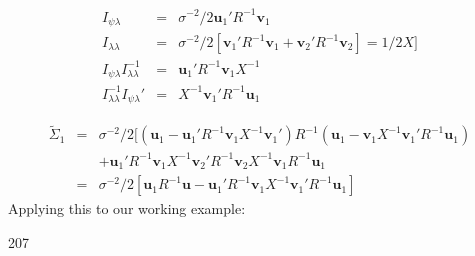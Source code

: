 \documentclass[12pt]{article}
\newcommand{\x}{\mathbf{x}}
\newcommand{\uu}{\mathbf{u}}
\newcommand{\vv}{\mathbf{v}}
\newcommand{\Ipl}{I_{\psi\lambda}}
\newcommand{\Ill}{I_{\lambda\lambda}}
\begin{document}
\begin{eqnarray*}
\Ipl & = & \sigma^{-2}/2\uu_1'R^{-1}\vv_1\\
\Ill & = & \sigma^{-2}/2[\vv_1'R^{-1}\vv_1 + \vv_2'R^{-1}\vv_2]=1/2X]\\
\Ipl\Ill^{-1} & = & \uu_1'R^{-1}\vv_1X^{-1}\\
\Ill^{-1}\Ipl' & = & X^{-1}\vv_1'R^{-1}\uu_1
\end{eqnarray*}

\begin{eqnarray*}
\tilde\Sigma_1 & = & \sigma^{-2}/2
[(\uu_1-\uu_1'R^{-1}\vv_1X^{-1}\vv_1')
R^{-1}
(\uu_1-\vv_1X^{-1}\vv_1'R^{-1}\uu_1)\\
& & +  \uu_1'R^{-1}\vv_1X^{-1}\vv_2'R^{-1}\vv_2X^{-1}\vv_1R^{-1}\uu_1\\
& = & 
\sigma^{-2}/2[\uu_1R^{-1}\uu - \uu_1'R^{-1}\vv_1X^{-1}\vv_1'R^{-1}\uu_1]
\end{eqnarray*}
Applying this to our working example:
\begin{Schunk}
\begin{Soutput}
     [,1]
[1,]  207
\end{Soutput}
\end{Schunk}

\end{document}
